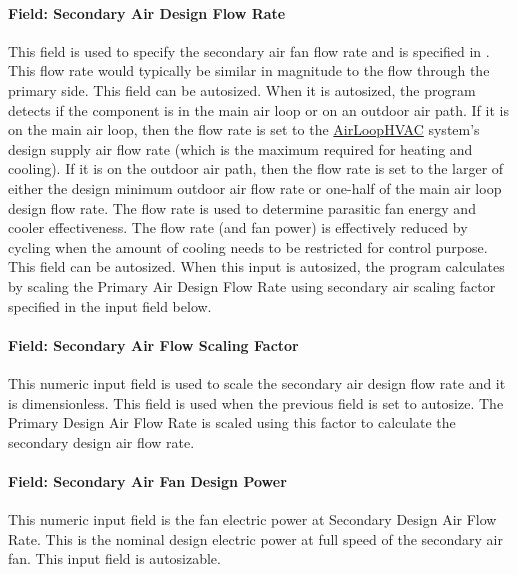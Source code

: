 \paragraph{Field: Secondary Air Design Flow Rate}\label{field-secondary-air-design-flow-rate}

This field is used to specify the secondary air fan flow rate and is specified in \si{\volumeFlowRate}. This flow rate would typically be similar in magnitude to the flow through the primary side. This field can be autosized. When it is autosized, the program detects if the component is in the main air loop or on an outdoor air path. If it is on the main air loop, then the flow rate is set to the \hyperref[airloophvac]{AirLoopHVAC} system's design supply air flow rate (which is the maximum required for heating and cooling). If it is on the outdoor air path, then the flow rate is set to the larger of either the design minimum outdoor air flow rate or one-half of the main air loop design flow rate. The flow rate is used to determine parasitic fan energy and cooler effectiveness. The flow rate (and fan power) is effectively reduced by cycling when the amount of cooling needs to be restricted for control purpose. This field can be autosized. When this input is autosized, the program calculates by scaling the Primary Air Design Flow Rate using secondary air scaling factor specified in the input field below.

\paragraph{Field: Secondary Air Flow Scaling Factor}\label{field-secondary-air-flow-scaling-factor}

This numeric input field is used to scale the secondary air design flow rate and it is dimensionless. This field is used when the previous field is set to autosize. The Primary Design Air Flow Rate is scaled using this factor to calculate the secondary design air flow rate.

\paragraph{Field: Secondary Air Fan Design Power}\label{field-secondary-air-fan-design-power}

This numeric input field is the fan electric power at Secondary Design Air Flow Rate. This is the nominal design electric power at full speed of the secondary air fan. This input field is autosizable.

